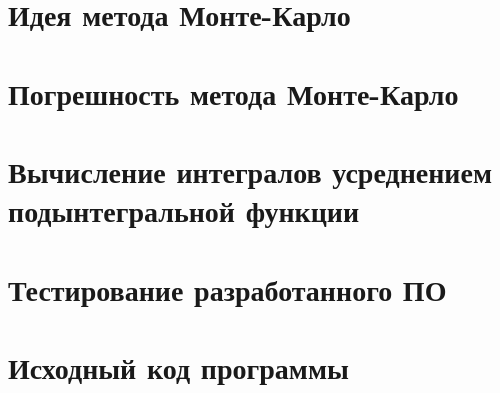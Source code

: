\documentclass[a4paper,12pt]{article}
\begin{document}
\newpage
\section{Идея метода Монте-Карло}

\newpage
\section{Погрешность метода Монте-Карло}

\newpage
\section{Вычисление интегралов усреднением подынтегральной функции}

\newpage
\section{Тестирование разработанного ПО}

\newpage
\section{Исходный код программы}
\end{document}
